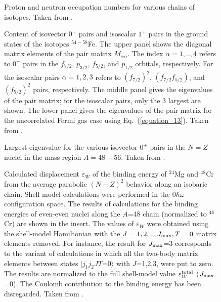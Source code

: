 \documentclass[preprint,rmp,aps,floatfix]{revtex4}
\begin{document}
\begin{figure}
\caption{Proton and neutron occupation numbers for various chains of isotopes.
Taken from  \protect\cite{Langanke95}.}
\label{fp_occs}
\end{figure}


\begin{figure}
\caption{Content of isovector $0^+$ pairs and isoscalar $1^+$ pairs
in the ground states of the isotopes
$^{54-58}$Fe.
The
upper panel shows the
diagonal matrix elements of the pair matrix $M_{\alpha\alpha}$.
The index $\alpha=1,..,4$ refers to $0^+$ pairs in the
$f_{7/2}$, $p_{3/2}$, $f_{5/2}$, and $p_{1/2}$ orbitals, respectively.
For the isoscalar pairs $\alpha=1,2,3$ refers to $(f_{7/2})^2$,
$(f_{7/2}f_{5/2})$, and $(f_{5/2})^2$ pairs, respectively.
The middle panel gives the eigenvalues of the pair matrix; for the
isoscalar pairs, only the 3 largest are shown. The lower panel
gives the eigenvalues of the pair matrix for the uncorrelated Fermi gas case
using Eq.~(\ref{equation_13}). Taken from  \protect\cite{Langanke95b}.
}
\label{fig_88}
\end{figure}

\begin{figure}
\caption{Largest eigenvalue for the various isovector $0^+$ pairs
in the $N=Z$ nuclei in the mass region $A=48-56$. 
Taken from \cite{langanke97}.}
\label{fig_89}
\end{figure}


\begin{figure}
\caption{
Calculated
displacement $\varepsilon_W$ of the binding energy of 
$^{24}$Mg and $^{48}$Cr
from the average parabolic $(N-Z)^2$
behavior along an isobaric chain.
 Shell-model calculations were performed in the 
$0\hbar\omega$ configuration  space.
The results of 
calculations for the binding energies
of even-even nuclei
along  the $A$=48 chain (normalized to  $^{48}$Cr)
are shown in the insert.
The values of  $\varepsilon_W$ 
were obtained using the shell-model Hamiltonian
with
the $J=1,2,..,J_{\rm max}, T=0$ matrix elements removed.
For instance, the result for $J_{\rm  max}$=3
corresponds to the variant of calculations in which
all the two-body  matrix elements between states
$|j_1j_2 JT$=$0\rangle$ with $J$=1,2,3, were put to zero.   
The results are normalized to  
the full shell-model value 
$\varepsilon_W^{\rm total}$ ($J_{\rm  max}$=0). 
The Coulomb contribution to the binding energy has been 
disregarded. Taken from  \protect\cite{Sat97}.
}
\label{satula_pn}
\end{figure}
\end{document}
